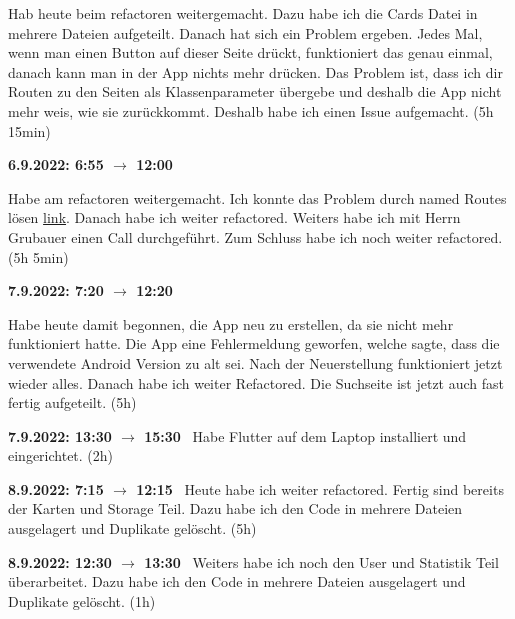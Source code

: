 Hab heute beim refactoren weitergemacht. Dazu habe ich die Cards Datei in mehrere Dateien aufgeteilt. Danach hat sich ein Problem ergeben. Jedes Mal, wenn man einen Button auf dieser Seite drückt, funktioniert das genau einmal, danach kann man in der App nichts mehr drücken. Das Problem ist, dass ich dir Routen zu den Seiten als Klassenparameter übergebe und deshalb die App nicht mehr weis, wie sie zurückkommt. Deshalb habe ich einen Issue aufgemacht. (5h 15min)

\vspace{0.5cm}

\textbf{6.9.2022: 6:55 $\rightarrow$ 12:00} \

Habe am refactoren weitergemacht. Ich konnte das Problem durch named Routes lösen \href{https://flutter.dev/docs/cookbook/navigation/named-routes}{link}. Danach habe ich weiter refactored. Weiters habe ich mit Herrn Grubauer einen Call durchgeführt. Zum Schluss habe ich noch weiter refactored. (5h 5min)

\vspace{0.5cm}

\textbf{7.9.2022: 7:20 $\rightarrow$ 12:20} \

Habe heute damit begonnen, die App neu zu erstellen, da sie nicht mehr funktioniert hatte. Die App eine Fehlermeldung geworfen, welche sagte, dass die verwendete Android Version zu alt sei. Nach der Neuerstellung funktioniert jetzt wieder alles. Danach habe ich weiter Refactored. Die Suchseite ist jetzt auch fast fertig aufgeteilt. (5h)

\vspace{0.5cm}

\textbf{7.9.2022: 13:30 $\rightarrow$ 15:30} \
Habe Flutter auf dem Laptop installiert und eingerichtet. (2h)

\vspace{0.5cm}

\textbf{8.9.2022: 7:15 $\rightarrow$ 12:15} \
Heute habe ich weiter refactored. Fertig sind bereits der Karten und Storage Teil. Dazu habe ich den Code in mehrere Dateien ausgelagert und Duplikate gelöscht. (5h)

\vspace{0.5cm}

\textbf{8.9.2022: 12:30 $\rightarrow$ 13:30} \
Weiters habe ich noch den User und Statistik Teil überarbeitet. Dazu habe ich den Code in mehrere Dateien ausgelagert und Duplikate gelöscht. (1h)

\vspace{0.5cm}

